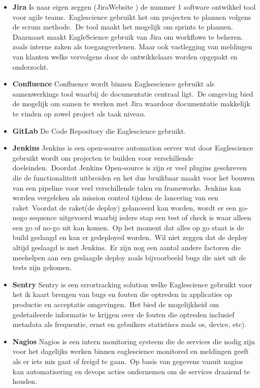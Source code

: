 \begin{itemize}
\item \textbf{Jira} Is naar eigen zeggen (JiraWebsite ) de nummer 1 software ontwikkel tool voor agile teams.\ Eaglescience gebruikt het om projecten te plannen volgens de scrum methode.\ De tool maakt het mogelijk om sprints te plannen. Daarnaast maakt EagleScience gebruik van Jira om workflows te beheren. zoals interne zaken als toegangverlenen. Maar ook vastlegging van meldingen van klanten welke vervolgens door de ontwikkelaars worden opgepakt en onderzocht.
\item \textbf{Confluence}
Confluence wordt binnen Eaglsescience gebruikt als samenwerkings tool waarbij de documentatie centraal ligt.\ De omgeving bied de mogelijk om samen te werken met Jira waardoor documentatie makkelijk te vinden op zowel project als taak niveau.
\item \textbf{GitLab}
De Code Repository die Eaglescience gebruikt.
\item \textbf{Jenkins}
Jenkins is een open-source automation server wat door Eaglescience gebruikt wordt om projecten te builden voor verschillende doeleinden.\ Doordat Jenkins Open-source is zijn er veel plugins geschreven die de functionaliteit uitbreiden en het dus bruikbaar maakt voor het bouwen van een pipeline voor veel verschillende talen en frameworks.
Jenkins kan worden vergeleken als mission control tijdens de lancering van een raket\ Voordat de raket(de deploy) gelanceerd kan worden, wordt er een go-nogo sequence uitgevoerd waarbij iedere stap een test of check is waar alleen een go of no-go uit kan komen.\ Op het moment dat alles op go staat is de build geslaagd en kan er gedeployed worden.\ Wil niet zeggen dat de deploy altijd geslaagd is met Jenkins.\ Er zijn nog een aantal andere factoren die meehelpen aan een geslaagde deploy zoals bijvoorbeeld bugs die niet uit de tests zijn gekomen.
\item \textbf{Sentry}
Sentry is een errortracking solution welke Eaglescience gebruikt voor het ik kaart brengen van bugs en fouten die optreden in applicaties op productie en acceptatie omgevingen.\ Het bied de mogelijkheid om gedetaileerde informatie te krijgen over de fouten die optreden inclusief metadata als frequentie, ernst en gebuikers statistiscs zoals os, device, etc).
\item \textbf{Nagios}
Nagios is een intern monitoring systeem die de services die nodig zijn voor het dagelijks werken binnen eaglescience monitored en meldingen geeft als er iets mis gaat of freigd te gaan.\ Op basis van gegevens vanuit nagios kan automatisering en devops acties ondernemen om de services draaiend te houden.

\end{itemize}

